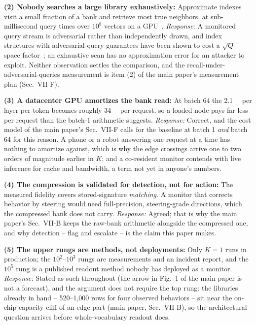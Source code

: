 \textbf{(2) Nobody searches a large library exhaustively:}
Approximate indexes visit a small fraction of a bank and retrieve most
true neighbors, at sub-millisecond query times over $10^{8}$ vectors
on a GPU~\cite{indyk1998lsh,malkov2020hnsw,faisscuvs2025}.
\emph{Response:} A monitored query stream is adversarial rather than
independently drawn, and index structures with adversarial-query
guarantees have been shown to cost a $\sqrt{Q}$ space
factor~\cite{andoni2026robustann}; an exhaustive scan has no
approximation error for an attacker to exploit. Neither observation
settles the comparison, and the recall-under-adversarial-queries
measurement is item (2) of the main paper's measurement plan (Sec.~VII-F).

\textbf{(3) A datacenter GPU amortizes the bank read:} At batch 64
the \qty{2.1}{\giga\byte} per layer per token becomes roughly
\qty{34}{\mega\byte} per request, so a loaded node pays far less per
request than the batch-1 arithmetic suggests. \emph{Response:}
Correct, and the cost model of the main paper's Sec.~VII-F
calls for the baseline at batch 1 \emph{and} batch 64 for this
reason. A phone or a robot answering one request at a time has
nothing to amortize against, which is why the edge crossings arrive
one to two orders of magnitude earlier in $K$; and a co-resident
monitor contends with live inference for cache and bandwidth, a term
not yet in anyone's numbers.

\textbf{(4) The compression is validated for detection, not for
action:} The measured fidelity covers stored-signature
\emph{matching}. A monitor that corrects behavior by steering would
need full-precision, steering-grade directions, which the compressed
bank does not carry. \emph{Response:} Agreed; that is why
the main paper's Sec.~VII-B keeps the raw-bank arithmetic alongside
the compressed one, and why detection -- flag and escalate -- is the
claim this paper makes.

\textbf{(5) The upper rungs are methods, not deployments:} Only
$K=1$ runs in production; the $10^{2}$--$10^{3}$ rungs are
measurements and an incident report, and the $10^{5}$ rung is a
published readout method nobody has deployed as a monitor.
\emph{Response:} Stated as such throughout (the arrow in
Fig.~1 of the main paper is not a forecast), and the argument does not
require the top rung: the libraries already in hand -- 520--1{,}000
rows for four observed behaviors -- sit near the on-chip capacity
cliff of an edge part (main paper, Sec.~VII-B), so the
architectural question arrives before whole-vocabulary readout does.
